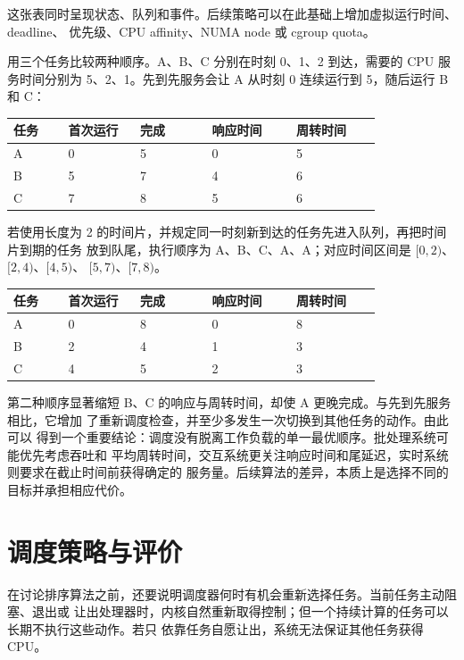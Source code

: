 这张表同时呈现状态、队列和事件。后续策略可以在此基础上增加虚拟运行时间、deadline、
优先级、CPU affinity、NUMA node 或 cgroup quota。

用三个任务比较两种顺序。A、B、C 分别在时刻 0、1、2 到达，需要的 CPU 服务时间分别为
5、2、1。先到先服务会让 A 从时刻 0 连续运行到 5，随后运行 B 和 C：

\begin{longtable}{|L{0.13\linewidth}|L{0.17\linewidth}|L{0.17\linewidth}|L{0.2\linewidth}|L{0.2\linewidth}|}
\toprule
任务 & 首次运行 & 完成 & 响应时间 & 周转时间 \\
\midrule
A & 0 & 5 & 0 & 5 \\\tablerowrule
B & 5 & 7 & 4 & 6 \\\tablerowrule
C & 7 & 8 & 5 & 6 \\
\bottomrule
\end{longtable}

若使用长度为 2 的时间片，并规定同一时刻新到达的任务先进入队列，再把时间片到期的任务
放到队尾，执行顺序为 A、B、C、A、A；对应时间区间是 $[0,2)$、$[2,4)$、$[4,5)$、
$[5,7)$、$[7,8)$。

\begin{longtable}{|L{0.13\linewidth}|L{0.17\linewidth}|L{0.17\linewidth}|L{0.2\linewidth}|L{0.2\linewidth}|}
\toprule
任务 & 首次运行 & 完成 & 响应时间 & 周转时间 \\
\midrule
A & 0 & 8 & 0 & 8 \\\tablerowrule
B & 2 & 4 & 1 & 3 \\\tablerowrule
C & 4 & 5 & 2 & 3 \\
\bottomrule
\end{longtable}

第二种顺序显著缩短 B、C 的响应与周转时间，却使 A 更晚完成。与先到先服务相比，它增加
了重新调度检查，并至少多发生一次切换到其他任务的动作。由此可以
得到一个重要结论：调度没有脱离工作负载的单一最优顺序。批处理系统可能优先考虑吞吐和
平均周转时间，交互系统更关注响应时间和尾延迟，实时系统则要求在截止时间前获得确定的
服务量。后续算法的差异，本质上是选择不同的目标并承担相应代价。

\section{调度策略与评价}

在讨论排序算法之前，还要说明调度器何时有机会重新选择任务。当前任务主动阻塞、退出或
让出处理器时，内核自然重新取得控制；但一个持续计算的任务可以长期不执行这些动作。若只
依靠任务自愿让出，系统无法保证其他任务获得 CPU。

